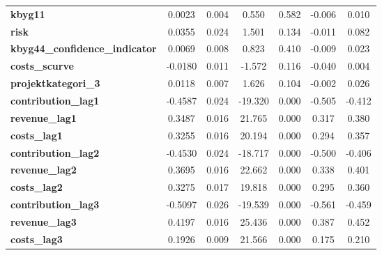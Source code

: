 \begin{center}
\begin{tabular}{lcccccc}
\textbf{kbyg11}                           &       0.0023  &        0.004     &     0.550  &         0.582        &       -0.006    &        0.010     \\
\textbf{risk}                             &       0.0355  &        0.024     &     1.501  &         0.134        &       -0.011    &        0.082     \\
\textbf{kbyg44\_confidence\_indicator}    &       0.0069  &        0.008     &     0.823  &         0.410        &       -0.009    &        0.023     \\
\textbf{costs\_scurve}                    &      -0.0180  &        0.011     &    -1.572  &         0.116        &       -0.040    &        0.004     \\
\textbf{projektkategori\_3}               &       0.0118  &        0.007     &     1.626  &         0.104        &       -0.002    &        0.026     \\
\textbf{contribution\_lag1}               &      -0.4587  &        0.024     &   -19.320  &         0.000        &       -0.505    &       -0.412     \\
\textbf{revenue\_lag1}                    &       0.3487  &        0.016     &    21.765  &         0.000        &        0.317    &        0.380     \\
\textbf{costs\_lag1}                      &       0.3255  &        0.016     &    20.194  &         0.000        &        0.294    &        0.357     \\
\textbf{contribution\_lag2}               &      -0.4530  &        0.024     &   -18.717  &         0.000        &       -0.500    &       -0.406     \\
\textbf{revenue\_lag2}                    &       0.3695  &        0.016     &    22.662  &         0.000        &        0.338    &        0.401     \\
\textbf{costs\_lag2}                      &       0.3275  &        0.017     &    19.818  &         0.000        &        0.295    &        0.360     \\
\textbf{contribution\_lag3}               &      -0.5097  &        0.026     &   -19.539  &         0.000        &       -0.561    &       -0.459     \\
\textbf{revenue\_lag3}                    &       0.4197  &        0.016     &    25.436  &         0.000        &        0.387    &        0.452     \\
\textbf{costs\_lag3}                      &       0.1926  &        0.009     &    21.566  &         0.000        &        0.175    &        0.210     \\

\end{tabular}
\end{center}
